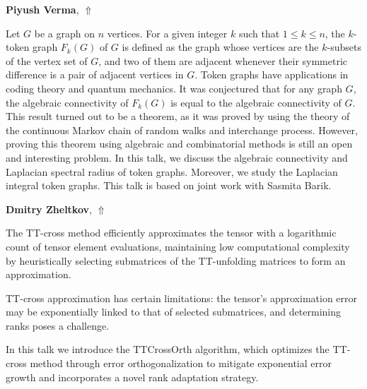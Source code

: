 \documentclass[ILAS2025-program.tex]{subfiles}
\begin{document}
\hypertarget{down0110}{}\begin{ilasabstract}
    
\textbf{Piyush Verma},  \hfill \hyperlink{up0110}{$\Uparrow$}
    
    
\mtskip
    Let $G$ be a graph on $n$ vertices. For a given integer $k$ such that $1\leq k \leq n$, the $k$-token graph $F_k(G)$ of $G$ is defined as the graph whose vertices are the $k$-subsets of the vertex set of $G$, and two of them are adjacent whenever their symmetric difference is a pair of adjacent vertices in $G$. Token graphs have applications in coding theory and quantum mechanics. It was conjectured that for any graph $G$, the algebraic connectivity of $F_k(G)$ is equal to the algebraic connectivity of $G$. This result turned out to be a theorem, as it was proved by using the theory of the continuous Markov chain of random walks and interchange process. However, proving this theorem using algebraic and combinatorial methods is still an open and interesting problem. In this talk, we discuss the algebraic connectivity and Laplacian spectral radius of token graphs. Moreover, we study the Laplacian integral token graphs. This talk is based on joint work with Sasmita Barik.
\end{ilasabstract}
    

\hypertarget{down0117}{}\begin{ilasabstract}
    
\textbf{Dmitry Zheltkov},  \hfill \hyperlink{up0117}{$\Uparrow$}
    
    
\mtskip
    The TT-cross method efficiently approximates the tensor with a logarithmic count of tensor element evaluations, maintaining low computational complexity by heuristically selecting submatrices of the TT-unfolding matrices to form an approximation.

TT-cross approximation has certain limitations: the tensor's approximation error may be exponentially linked to that of selected submatrices, and determining ranks poses a challenge.

In this talk we introduce the TTCrossOrth algorithm, which optimizes the TT-cross method through error orthogonalization to mitigate exponential error growth and incorporates a novel rank adaptation strategy.

\end{ilasabstract}
    \newpage
\end{document}
